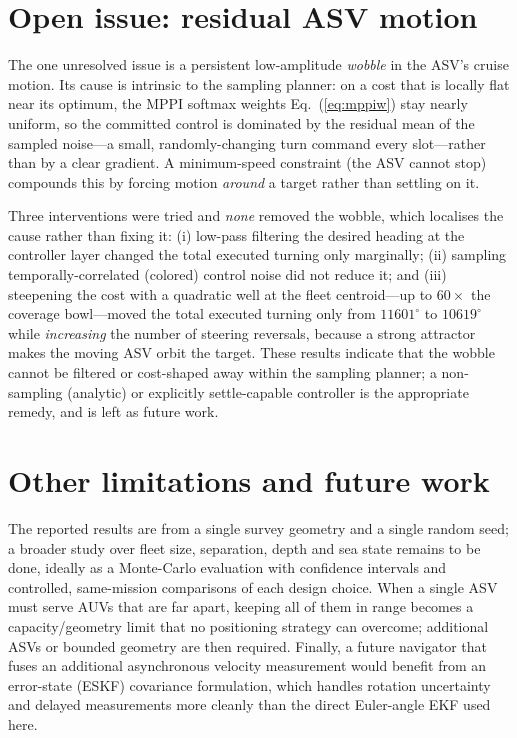 \documentclass[12pt,a4paper,oneside]{book}
\newcommand{\eqnref}[1]{Eq.~(\ref{#1})}
\begin{document}
\section{Open issue: residual ASV motion}
\label{sec:wobble}
The one unresolved issue is a persistent low-amplitude \emph{wobble} in the ASV's cruise motion. Its cause
is intrinsic to the sampling planner: on a cost that is locally flat near its optimum, the MPPI softmax
weights \eqnref{eq:mppiw} stay nearly uniform, so the committed control is dominated by the residual mean of
the sampled noise---a small, randomly-changing turn command every slot---rather than by a clear gradient. A
minimum-speed constraint (the ASV cannot stop) compounds this by forcing motion \emph{around} a target
rather than settling on it.

Three interventions were tried and \emph{none} removed the wobble, which localises the cause rather than
fixing it: (i) low-pass filtering the desired heading at the controller layer changed the total executed
turning only marginally; (ii) sampling temporally-correlated (colored) control noise did not reduce it;
and (iii) steepening the cost with a quadratic well at the fleet centroid---up to $60\times$ the coverage
bowl---moved the total executed turning only from $11601^{\circ}$ to $10619^{\circ}$ while \emph{increasing}
the number of steering reversals, because a strong attractor makes the moving ASV orbit the target. These
results indicate that the wobble cannot be filtered or cost-shaped away within the sampling planner; a
non-sampling (analytic) or explicitly settle-capable controller is the appropriate remedy, and is left as
future work.

\section{Other limitations and future work}
The reported results are from a single survey geometry and a single random seed; a broader study over fleet
size, separation, depth and sea state remains to be done, ideally as a Monte-Carlo evaluation with
confidence intervals and controlled, same-mission comparisons of each design choice. When a single ASV must
serve AUVs that are far apart, keeping all of them in range becomes a capacity/geometry limit that no
positioning strategy can overcome; additional ASVs or bounded geometry are then required. Finally, a future
navigator that fuses an additional asynchronous velocity measurement would benefit from an error-state
(ESKF) covariance formulation, which handles rotation uncertainty and delayed measurements more cleanly than
the direct Euler-angle EKF used here.
\end{document}
